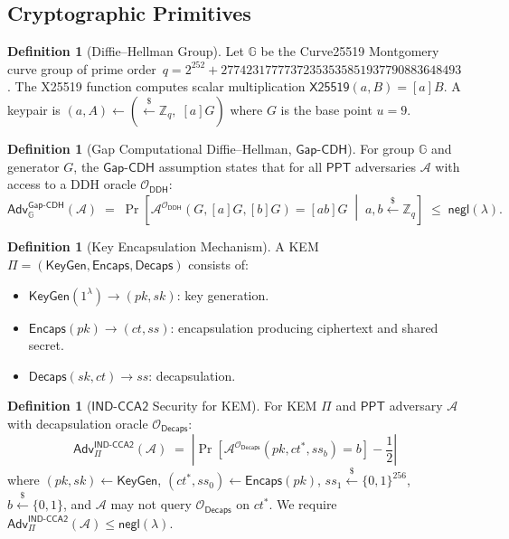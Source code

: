 \documentclass[11pt,a4paper]{article}
\theoremstyle{definition}
\newtheorem{definition}[theorem]{Definition}
\theoremstyle{remark}
\newcommand{\secpar}{\lambda}
\newcommand{\negl}{\mathsf{negl}}
\newcommand{\ppt}{\mathsf{PPT}}
\newcommand{\adv}{\mathsf{Adv}}
\newcommand{\advA}{\mathcal{A}}
\newcommand{\oracle}{\mathcal{O}}
\renewcommand{\DH}{\mathsf{X25519}}
\newcommand{\KeyGen}{\mathsf{KeyGen}}
\newcommand{\Encaps}{\mathsf{Encaps}}
\newcommand{\Decaps}{\mathsf{Decaps}}
\newcommand{\GapCDH}{\mathsf{Gap\text{-}CDH}}
\newcommand{\INDCCA}{\mathsf{IND\text{-}CCA2}}
\newcommand{\getsr}{\xleftarrow{\$}}
\newcommand{\bits}{\{0,1\}}
\begin{document}
\subsection{Cryptographic Primitives}

\begin{definition}[Diffie--Hellman Group]
\label{def:dh}
Let $\mathbb{G}$ be the Curve25519 Montgomery curve group of
prime order~$q = 2^{252} + 27742317777372353535851937790883648493$.
The X25519 function computes scalar multiplication $\DH(a, B) = [a]B$.
A keypair is $(a, A) \gets (\getsr \mathbb{Z}_q,\; [a]G)$ where $G$ is the
base point $u = 9$.
\end{definition}

\begin{definition}[Gap Computational Diffie--Hellman, $\GapCDH$]
\label{def:gapcdh}
For group $\mathbb{G}$ and generator $G$, the $\GapCDH$ assumption states that
for all $\ppt$ adversaries $\advA$ with access to a DDH oracle $\oracle_{\mathsf{DDH}}$:
\[
  \adv^{\GapCDH}_{\mathbb{G}}(\advA) \;=\;
  \Pr\!\left[\advA^{\oracle_{\mathsf{DDH}}}(G, [a]G, [b]G) = [ab]G
  \;\middle|\; a,b \getsr \mathbb{Z}_q\right]
  \;\leq\; \negl(\secpar).
\]
\end{definition}

\begin{definition}[Key Encapsulation Mechanism]
\label{def:kem}
A KEM $\Pi = (\KeyGen, \Encaps, \Decaps)$ consists of:
\begin{itemize}[nosep]
  \item $\KeyGen(1^\secpar) \to (\mathit{pk}, \mathit{sk})$: key generation.
  \item $\Encaps(\mathit{pk}) \to (\mathit{ct}, \mathit{ss})$: encapsulation producing ciphertext and shared secret.
  \item $\Decaps(\mathit{sk}, \mathit{ct}) \to \mathit{ss}$: decapsulation.
\end{itemize}
\end{definition}

\begin{definition}[$\INDCCA$ Security for KEM]
\label{def:indcca}
For KEM $\Pi$ and $\ppt$ adversary $\advA$ with decapsulation oracle
$\oracle_{\Decaps}$:
\[
  \adv^{\INDCCA}_\Pi(\advA) \;=\;
  \left|\Pr\!\left[\advA^{\oracle_{\Decaps}}(\mathit{pk}, \mathit{ct}^*, \mathit{ss}_b) = b\right] - \frac{1}{2}\right|
\]
where $(\mathit{pk}, \mathit{sk}) \gets \KeyGen$,
$(\mathit{ct}^*, \mathit{ss}_0) \gets \Encaps(\mathit{pk})$,
$\mathit{ss}_1 \getsr \bits^{256}$, $b \getsr \{0,1\}$, and $\advA$ may not
query $\oracle_{\Decaps}$ on $\mathit{ct}^*$.  We require
$\adv^{\INDCCA}_\Pi(\advA) \leq \negl(\secpar)$.
\end{definition}
\end{document}
